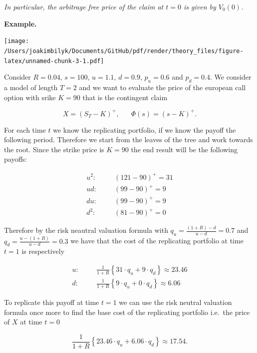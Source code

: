 \documentclass[
]{article}
\begin{document}
\emph{In particular, the arbitrage free price of the claim at \(t=0\) is
given by \(V_0(0)\).}

\textbf{Example.}

\texttt{[image: /Users/joakimbilyk/Documents/GitHub/pdf/render/theory\_files/figure-latex/unnamed-chunk-3-1.pdf]}

Consider \(R=0.04\), \(s=100\), \(u=1.1\), \(d=0.9\), \(p_u=0.6\) and
\(p_d=0.4\). We consider a model of length \(T=2\) and we want to
evaluate the price of the european call option with srike \(K=90\) that
is the contingent claim

\[
X=(S_T-K)^+,\hspace{20pt}\Phi(s)=(s-K)^+.
\]

For each time \(t\) we know the replicating portfolio, if we know the
payoff the following period. Therefore we start from the leaves of the
tree and work towards the root. Since the strike price is \(K=90\) the
end result will be the following payoffs:

\begin{align*}
u^2:\hspace{20pt}&(121-90)^+=31\\
ud:\hspace{20pt}&(99-90)^+=9\\
du:\hspace{20pt}&(99-90)^+=9\\
d^2:\hspace{20pt}&(81-90)^+=0
\end{align*}

Therefore by the risk neautral valuation formula with
\(q_u=\frac{(1+R)-d}{u-d}=0.7\) and \(q_d=\frac{u-(1+R)}{u-d}=0.3\) we
have that the cost of the replicating portfolio at time \(t=1\) is
respectively

\begin{align*}
u:\hspace{20pt}&\frac{1}{1+R}\left\{31\cdot q_u + 9 \cdot q_d\right\}\approx 23.46\\
d:\hspace{20pt}&\frac{1}{1+R}\left\{9\cdot q_u + 0 \cdot q_d\right\}\approx 6.06
\end{align*}

To replicate this payoff at time \(t=1\) we can use the risk neutral
valuation formula once more to find the base cost of the replicating
portfolio i.e.~the price of \(X\) at time \(t=0\)

\[
\frac{1}{1+R}\left\{23.46\cdot q_u + 6.06 \cdot q_d\right\}\approx 17.54.
\]
\end{document}
